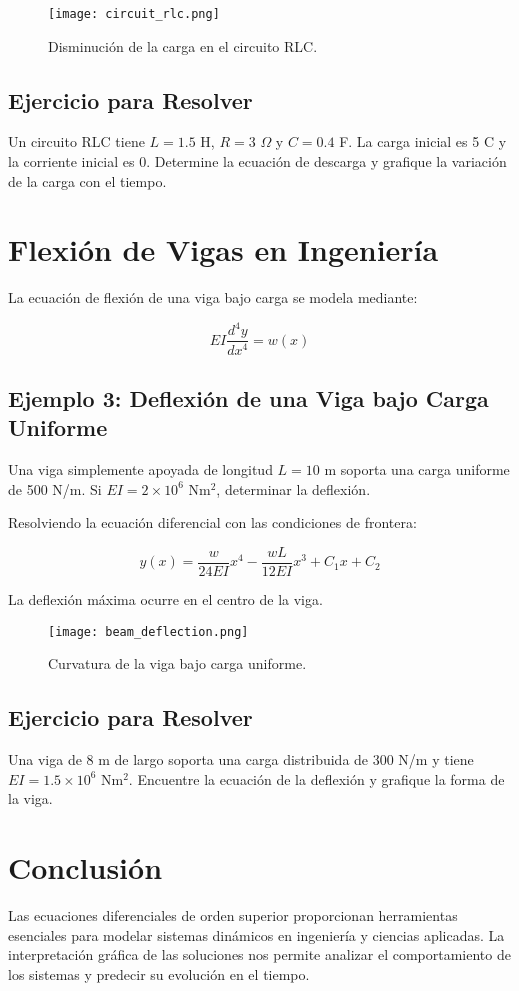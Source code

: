 \begin{figure}[H]
    \centering
    \texttt{[image: circuit\_rlc.png]}
    \caption{Disminución de la carga en el circuito RLC.}
\end{figure}

\subsection*{Ejercicio para Resolver}
Un circuito RLC tiene \( L = 1.5 \) H, \( R = 3 \) \( \Omega \) y \( C = 0.4 \) F. La carga inicial es 5 C y la corriente inicial es 0. Determine la ecuación de descarga y grafique la variación de la carga con el tiempo.

\section{Flexión de Vigas en Ingeniería}
La ecuación de flexión de una viga bajo carga se modela mediante:

\begin{equation}
EI \frac{d^4 y}{dx^4} = w(x)
\end{equation}

\subsection*{Ejemplo 3: Deflexión de una Viga bajo Carga Uniforme}
Una viga simplemente apoyada de longitud \( L = 10 \) m soporta una carga uniforme de 500 N/m. Si \( EI = 2 \times 10^6 \) Nm\(^2\), determinar la deflexión.

Resolviendo la ecuación diferencial con las condiciones de frontera:

\begin{equation}
y(x) = \frac{w}{24EI} x^4 - \frac{wL}{12EI} x^3 + C_1 x + C_2
\end{equation}

La deflexión máxima ocurre en el centro de la viga.

\begin{figure}[H]
    \centering
    \texttt{[image: beam\_deflection.png]}
    \caption{Curvatura de la viga bajo carga uniforme.}
\end{figure}

\subsection*{Ejercicio para Resolver}
Una viga de 8 m de largo soporta una carga distribuida de 300 N/m y tiene \( EI = 1.5 \times 10^6 \) Nm\(^2\). Encuentre la ecuación de la deflexión y grafique la forma de la viga.

\section{Conclusión}
Las ecuaciones diferenciales de orden superior proporcionan herramientas esenciales para modelar sistemas dinámicos en ingeniería y ciencias aplicadas. La interpretación gráfica de las soluciones nos permite analizar el comportamiento de los sistemas y predecir su evolución en el tiempo.

